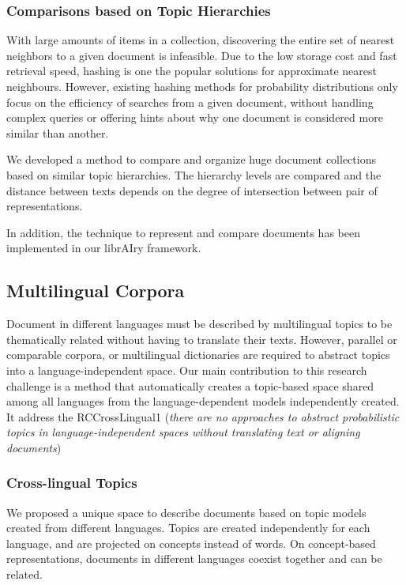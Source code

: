 \subsubsection{Comparisons based on Topic Hierarchies}

With large amounts of items in a collection, discovering the entire set of nearest neighbors to a given document is infeasible. Due to the low storage cost and fast retrieval speed, hashing is one the popular solutions for approximate nearest neighbours. However, existing hashing methods for probability distributions only focus on the efficiency of searches from a given document, without handling complex queries or offering hints about why one document is considered more similar than another.

We developed a method to compare and organize huge document collections based on similar topic hierarchies. The hierarchy levels are compared and the distance between texts depends on the degree of intersection between pair of representations.

In addition, the technique to represent and compare documents has been implemented in our librAIry framework.

\subsection{Multilingual Corpora}

Document in different languages must be described by multilingual topics to be thematically related without having to translate their texts. However, parallel or comparable corpora, or multilingual dictionaries are required to abstract topics into a language-independent space. Our main contribution to this research challenge is a method that automatically creates a topic-based space shared among all languages from the language-dependent models independently created. It address the RCCrossLingual1 (\textit{there are no approaches to abstract probabilistic topics in language-independent spaces without translating text or aligning documents}) 

\subsubsection{Cross-lingual Topics}

We proposed a unique space to describe documents based on topic models created from different languages. Topics are created independently for each language, and are projected on concepts instead of words. On concept-based representations, documents in different languages coexist together and can be related.

